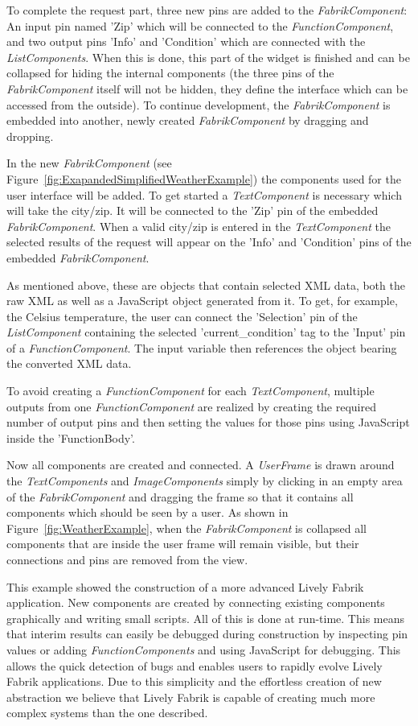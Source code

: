 \documentclass[pdftex, times, 10pt, twocolumn]{article}
\begin{document}
To complete the request part, three new pins are added to the {\em FabrikComponent}: An input pin named 'Zip' which will be connected to the {\em FunctionComponent}, and two output pins 'Info' and 'Condition' which are connected with the {\em ListComponents}. When this is done, this part of the widget is finished and can be collapsed for hiding the internal components (the three pins of the {\em FabrikComponent} itself will not be hidden, they define the interface which can be accessed from the outside). To continue development, the {\em FabrikComponent} is embedded into another, newly created {\em FabrikComponent} by dragging and dropping. 

In the new {\em FabrikComponent} (see Figure~\ref{fig:ExapandedSimplifiedWeatherExample}) the components used for the user interface will be added. To get started a {\em TextComponent} is necessary which will take the city/zip. It will be connected to the 'Zip' pin of the embedded {\em FabrikComponent}. When a valid city/zip is entered in the {\em TextComponent} the selected results of the request will appear on the 'Info' and 'Condition' pins of the embedded {\em FabrikComponent}. 

As mentioned above, these are objects that contain selected XML data, both the raw XML as well as a JavaScript object generated from it. To get, for example, the Celsius temperature, the user can connect the 'Selection' pin of the {\em ListComponent} containing the selected 'current\_condition' tag to the 'Input' pin of a {\em FunctionComponent}. The input variable then references the object bearing the converted XML data.  

To avoid creating a {\em FunctionComponent} for each {\em TextComponent}, multiple outputs from one {\em FunctionComponent} are realized by creating the required number of output pins and then setting the values for those  pins using JavaScript inside the 'FunctionBody'. 

Now all components are created and connected. A {\em UserFrame} is drawn around the {\em TextComponents} and  {\em ImageComponents} simply by clicking in an empty area of the {\em FabrikComponent} and dragging the frame so that it contains all components which should be seen by a user. As shown in Figure~\ref{fig:WeatherExample}, when the {\em FabrikComponent} is collapsed all components that are inside the user frame will remain visible, but their connections and pins are removed from the view. 

This example showed the construction of a more advanced Lively Fabrik application. New components are created by connecting existing components graphically and writing small scripts. All of this is done at run-time. This means that interim results can easily be debugged during construction by inspecting pin values or adding {\em FunctionComponents} and using JavaScript for debugging. This allows the quick detection of bugs and enables users to rapidly evolve Lively Fabrik applications. Due to this simplicity and the effortless creation of new abstraction we believe that Lively Fabrik is capable of creating much more complex systems than the one described. 
\end{document}
